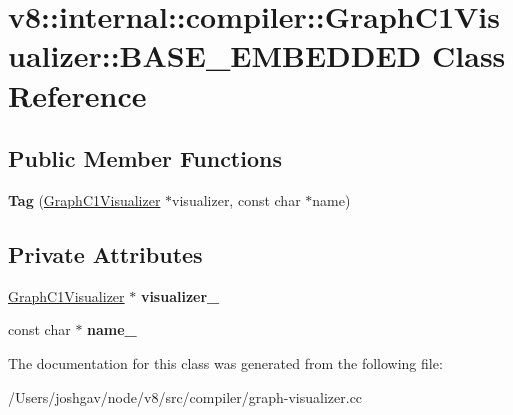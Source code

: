 \hypertarget{classv8_1_1internal_1_1compiler_1_1_graph_c1_visualizer_1_1_b_a_s_e___e_m_b_e_d_d_e_d}{}\section{v8\+:\+:internal\+:\+:compiler\+:\+:Graph\+C1\+Visualizer\+:\+:B\+A\+S\+E\+\_\+\+E\+M\+B\+E\+D\+D\+ED Class Reference}
\label{classv8_1_1internal_1_1compiler_1_1_graph_c1_visualizer_1_1_b_a_s_e___e_m_b_e_d_d_e_d}
\subsection*{Public Member Functions}
\begin{DoxyCompactItemize}
\item 
{\bfseries Tag} (\hyperlink{classv8_1_1internal_1_1compiler_1_1_graph_c1_visualizer}{Graph\+C1\+Visualizer} $\ast$visualizer, const char $\ast$name)\hypertarget{classv8_1_1internal_1_1compiler_1_1_graph_c1_visualizer_1_1_b_a_s_e___e_m_b_e_d_d_e_d_ae113334e8f8f66d232748dce0b8c09f7}{}\label{classv8_1_1internal_1_1compiler_1_1_graph_c1_visualizer_1_1_b_a_s_e___e_m_b_e_d_d_e_d_ae113334e8f8f66d232748dce0b8c09f7}

\end{DoxyCompactItemize}
\subsection*{Private Attributes}
\begin{DoxyCompactItemize}
\item 
\hyperlink{classv8_1_1internal_1_1compiler_1_1_graph_c1_visualizer}{Graph\+C1\+Visualizer} $\ast$ {\bfseries visualizer\+\_\+}\hypertarget{classv8_1_1internal_1_1compiler_1_1_graph_c1_visualizer_1_1_b_a_s_e___e_m_b_e_d_d_e_d_a1c591feb630242c356ad88c81ada88b1}{}\label{classv8_1_1internal_1_1compiler_1_1_graph_c1_visualizer_1_1_b_a_s_e___e_m_b_e_d_d_e_d_a1c591feb630242c356ad88c81ada88b1}

\item 
const char $\ast$ {\bfseries name\+\_\+}\hypertarget{classv8_1_1internal_1_1compiler_1_1_graph_c1_visualizer_1_1_b_a_s_e___e_m_b_e_d_d_e_d_a908c66e739c972d30cd4793d83cf5bc1}{}\label{classv8_1_1internal_1_1compiler_1_1_graph_c1_visualizer_1_1_b_a_s_e___e_m_b_e_d_d_e_d_a908c66e739c972d30cd4793d83cf5bc1}

\end{DoxyCompactItemize}


The documentation for this class was generated from the following file\+:\begin{DoxyCompactItemize}
\item 
/\+Users/joshgav/node/v8/src/compiler/graph-\/visualizer.\+cc\end{DoxyCompactItemize}
